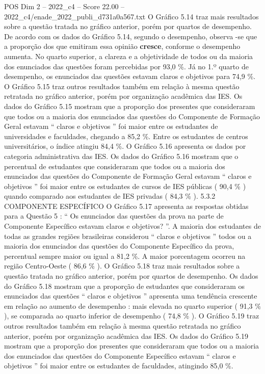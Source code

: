 \begin{textsample}{POS Dim 2 – 2022\_c4 – Score 22.00 – 2022\_c4/enade\_2022\_publi\_d731a0a567.txt}
O Gráfico 5.14 traz mais resultados sobre a questão tratada no gráfico anterior, porém por quartos de desempenho.
De acordo com os dados do Gráfico 5.14, segundo o desempenho, observa -se que a proporção dos que emitiram essa opinião \textbf{cresce}, conforme o desempenho aumenta.
No quarto superior, a clareza e a objetividade de todos ou da maioria dos enunciados das questões foram percebidas por 93,0 \%.
Já no 1.º quarto de desempenho, os enunciados das questões estavam claros e objetivos para 74,9 \%.
O Gráfico 5.15 traz outros resultados também em relação à mesma questão retratada no gráfico anterior, porém por organização acadêmica das IES.
Os dados do Gráfico 5.15 mostram que a proporção dos presentes que consideraram que todos ou a maioria dos enunciados das questões do Componente de Formação Geral estavam “ claros e objetivos ” foi maior entre os estudantes de universidades e faculdades, chegando a 85,2 \%.
Entre os estudantes de centros universitários, o índice atingiu 84,4 \%.
O Gráfico 5.16 apresenta os dados por categoria administrativa das IES.
Os dados do Gráfico 5.16 mostram que o percentual de estudantes que consideraram que todos ou a maioria dos enunciados das questões do Componente de Formação Geral estavam “ claros e objetivos ” foi maior entre os estudantes de cursos de IES públicas ( 90,4 \% ) quando comparado aos estudantes de IES privadas ( 84,3 \% ). 5.3.2 COMPONENTE ESPECÍFICO O Gráfico 5.17 apresenta as respostas obtidas para a Questão 5 : “ Os enunciados das questões da prova na parte de Componente Específico estavam claros e objetivos? ”.
A maioria dos estudantes de todas as grandes regiões brasileiras considerou “ claros e objetivos ” todos ou a maioria dos enunciados das questões do Componente Específico da prova, percentual sempre maior ou igual a 81,2 \%.
A maior porcentagem ocorreu na região Centro-Oeste ( 86,6 \% ).
O Gráfico 5.18 traz mais resultados sobre a questão tratada no gráfico anterior, porém por quartos de desempenho.
Os dados do Gráfico 5.18 mostram que a proporção de estudantes que consideraram os enunciados das questões “ claros e objetivos ” apresenta uma tendência crescente em relação ao aumento de desempenho : mais elevada no quarto superior ( 91,3 \% ), se comparada ao quarto inferior de desempenho ( 74,8 \% ).
O Gráfico 5.19 traz outros resultados também em relação à mesma questão retratada no gráfico anterior, porém por organização acadêmica das IES.
Os dados do Gráfico 5.19 mostram que a proporção dos presentes que consideraram que todos ou a maioria dos enunciados das questões do Componente Específico estavam “ claros e objetivos ” foi maior entre os estudantes de faculdades, atingindo 85,0 \%.

\end{textsample}

